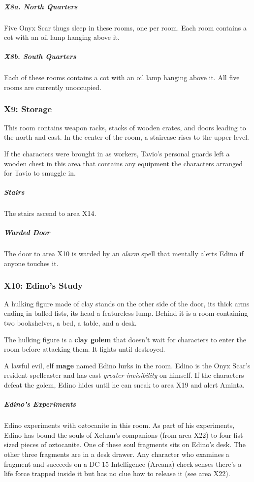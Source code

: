 \documentclass[10pt,a4paper,twoside,bg=print,twocolumn,openany,nodeprecatedcode]{dndbook}
\begin{document}
\subparagraph{X8a. North Quarters}
Five Onyx Scar thugs sleep in these rooms, one per room. Each room contains a cot with an oil lamp hanging above it.

\subparagraph{X8b. South Quarters}
Each of these rooms contains a cot with an oil lamp hanging above it. All five rooms are currently unoccupied.

\subsubsection{X9: Storage}
\begin{DndReadAloud}{}
This room contains weapon racks, stacks of wooden crates, and doors leading to the north and east. In the center of the room, a staircase rises to the upper level.

\end{DndReadAloud}

If the characters were brought in as workers, Tavio's personal guards left a wooden chest in this area that contains any equipment the characters arranged for Tavio to smuggle in.

\subparagraph{Stairs}
The stairs ascend to area X14.

\subparagraph{Warded Door}
The door to area X10 is warded by an \textit{alarm} spell that mentally alerts Edino if anyone touches it.

\subsubsection{X10: Edino's Study}
\begin{DndReadAloud}{}
A hulking figure made of clay stands on the other side of the door, its thick arms ending in balled fists, its head a featureless lump. Behind it is a room containing two bookshelves, a bed, a table, and a desk.

\end{DndReadAloud}

The hulking figure is a \textbf{clay golem} that doesn't wait for characters to enter the room before attacking them. It fights until destroyed.

A lawful evil, elf \textbf{mage} named Edino lurks in the room. Edino is the Onyx Scar's resident spellcaster and has cast \textit{greater invisibility} on himself. If the characters defeat the golem, Edino hides until he can sneak to area X19 and alert Aminta.

\subparagraph{Edino's Experiments}
Edino experiments with oztocanite in this room. As part of his experiments, Edino has bound the souls of Xeluan's companions (from area X22) to four fist-sized pieces of oztocanite. One of these soul fragments sits on Edino's desk. The other three fragments are in a desk drawer. Any character who examines a fragment and succeeds on a DC 15 Intelligence (Arcana) check senses there's a life force trapped inside it but has no clue how to release it (see area X22).
\end{document}
